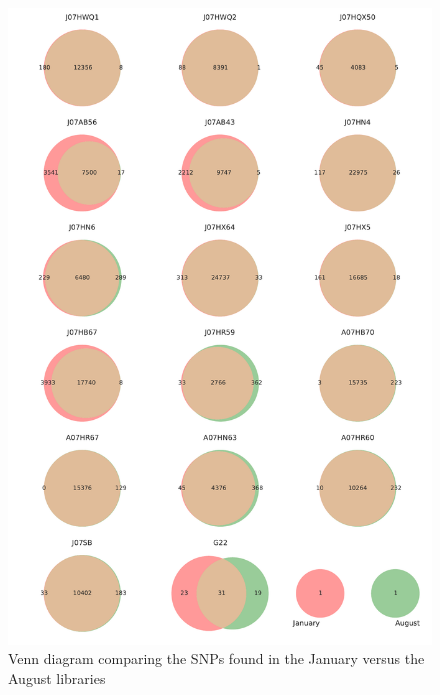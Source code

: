 \begin{figure}[!hbtp]
  \centering
  \includegraphics[width=\textwidth,height=0.9\textheight,keepaspectratio]{Chapter5/Figures/Venn_JanAugSNPs.pdf}
  \caption{Venn diagram comparing the SNPs found in the January versus the August libraries}
  \label{VennBoth}
\end{figure}

